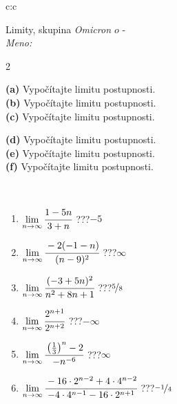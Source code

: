 \documentclass[10pt]{report}
\newcommand\omicron{o}
\begin{document}
\newpage
\thispagestyle{empty}
\begin{tabular}{c:c}
\begin{minipage}[c][104.5mm][t]{0.5\linewidth}
\begin{center}
\vspace{5mm}
{\huge Limity, skupina \textit{Omicron $\omicron$} -}\\[5mm]
\textit{Meno:}\phantom{xxxxxxxxxxxxxxxxxxxxxxxxxxxxxxxxxxxxxxxxxxxxxxxxxxxxxxxxxxxxxxxxx}\\[5mm]
\begin{minipage}{0.95\linewidth}
\begin{center}
{\small \begin{multicols}{2} \raggedright
\textbf{(a)} Vypočítajte limitu postupnosti. \\[1mm]
\textbf{(b)} Vypočítajte limitu postupnosti. \\[1mm]
\textbf{(c)} Vypočítajte limitu postupnosti. \par \columnbreak
\textbf{(d)} Vypočítajte limitu postupnosti. \\[1mm]
\textbf{(e)} Vypočítajte limitu postupnosti. \\[1mm]
\textbf{(f)} Vypočítajte limitu postupnosti.
\end{multicols}
}
\end{center}
\end{minipage}
\\[1mm]
\begin{minipage}{0.79\linewidth}
\begin{center}
\begin{varwidth}{\linewidth}
\setlength{\itemsep}{0pt}
\begin{enumerate}
\footnotesizerr
\item $\lim\limits_{n\to\infty}\cfrac{1-5n}{3+n}$\quad \dotfill\; ???\;\dotfill \quad $-5$
\item $\lim\limits_{n\to\infty}\cfrac{-2(-1-n)}{(n-9)^2}$\quad \dotfill\; ???\;\dotfill \quad $\infty$
\item $\lim\limits_{n\to\infty}\cfrac{(-3+5n)^2}{n^2+8n+1}$\quad \dotfill\; ???\;\dotfill \quad $\nicefrac{5}{8}$
\item $\lim\limits_{n\to\infty}\cfrac{2^{n+1}}{2^{n+2}}$\quad \dotfill\; ???\;\dotfill \quad $-\infty$
\item $\lim\limits_{n\to\infty}\cfrac{\left(\frac{1}{3}\right)^n -2}{-n^{-6}}$\quad \dotfill\; ???\;\dotfill \quad $\infty$
\item $\lim\limits_{n\to\infty}\cfrac{-16\cdot 2^{n-2}+4\cdot 4^{n-2}}{-4\cdot 4^{n-1}-16\cdot 2^{n+1}}$\quad \dotfill\; ???\;\dotfill \quad $\nicefrac{-1}{4}$

\end{enumerate}
\end{varwidth}
\end{center}
\end{minipage}
\end{center}
\end{minipage}
\end{tabular}
\end{document}
